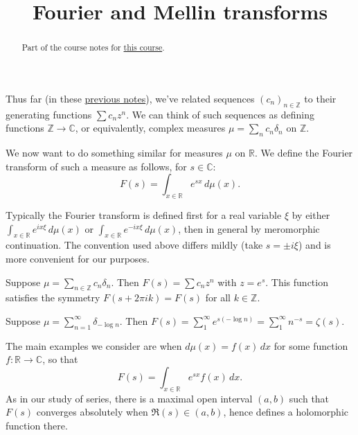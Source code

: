 \documentclass[reqno]{amsart} 
\begin{document}
\usepackage{xr-hyper}



\title{Fourier and Mellin transforms}

\begin{abstract}
  Part of the course notes for \href{2023-introduction-to-zeta-and-l-functions.pdf}{this course}.
\end{abstract}

Thus far (in these \href{20230907T142550--generating-functions-asymptotics.tex.pdf}{previous notes}), we've related sequences $(c_n)_{n \in \mathbb{Z}}$ to their generating functions $\sum c_n z^n$.  We can think of such sequences as defining functions $\mathbb{Z} \rightarrow \mathbb{C}$, or equivalently, complex measures $\mu = \sum_n c_n \delta_n$ on $\mathbb{Z}$.

We now want to do something similar for measures $\mu$ on $\mathbb{R}$. We define the Fourier transform of such a measure as follows, for $s \in \mathbb{C}$:
\begin{equation*}
  F(s) = \int_{x \in \mathbb{R} } e^{s x } \, d \mu (x).
\end{equation*}
\begin{remark}
  Typically the Fourier transform is defined first for a real variable $\xi$ by either $\int_{x \in \mathbb{R} } e^{i x \xi } \, d \mu(x)$ or $\int_{x \in \mathbb{R} } e^{-i x \xi } \, d \mu(x)$, then in general by meromorphic continuation.  The convention used above differs mildly (take $s = \pm i \xi$) and is more convenient for our purposes.
\end{remark}
\begin{example}
  Suppose $\mu = \sum_{n \in \mathbb{Z} } c_n \delta_n$.  Then $F (s) = \sum c_n z^n$ with $z = e^s$.  This function satisfies the symmetry $F (s + 2 \pi i k) = F (s)$ for all $k \in \mathbb{Z}$.
\end{example}
\begin{example}
  Suppose $\mu = \sum_{n =1 }^\infty \delta_{- \log n}$.  Then $F (s) = \sum_1^\infty e^{s (- \log n )} = \sum_1^\infty n^{- s} = \zeta(s)$.
\end{example}
The main examples we consider are when $d \mu (x) = f (x) \, d x$ for some function $f : \mathbb{R} \rightarrow \mathbb{C}$, so that
\begin{equation*}
  F (s) = \int_{x \in \mathbb{R} } e^{s x } f (x) \, d x.
\end{equation*}
As in our study of series, there is a maximal open interval $(a,b)$ such that $F (s)$ converges absolutely when $\Re(s) \in (a,b)$, hence defines a holomorphic function there.
\end{document}
